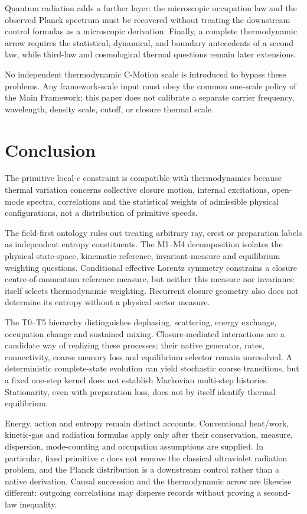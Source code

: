 \documentclass[11pt]{article}
\theoremstyle{definition}
\newcommand{\cmotion}{\mbox{C-Motion}}
\begin{document}
Quantum radiation adds a further layer: the microscopic occupation law and the observed
Planck spectrum must be recovered without treating the downstream control formulas as a
microscopic derivation.  Finally, a complete thermodynamic arrow requires the statistical,
dynamical, and boundary antecedents of a second law, while third-law and cosmological
thermal questions remain later extensions.

No independent thermodynamic \cmotion{} scale is introduced to bypass these problems.
Any framework-scale input must obey the common one-scale policy of the Main Framework;
this paper does not calibrate a separate carrier frequency, wavelength, density scale,
cutoff, or closure thermal scale.

\section{Conclusion}
\label{sec:conclusion}
The primitive local-$c$ constraint is compatible with thermodynamics because
thermal variation concerns collective closure motion, internal excitations,
open-mode spectra, correlations and the statistical weights of admissible
physical configurations, not a distribution of primitive speeds.

The field-first ontology rules out treating arbitrary ray, crest or preparation
labels as independent entropy constituents.  The M1--M4 decomposition isolates
the physical state-space, kinematic reference, invariant-measure and equilibrium
weighting questions.  Conditional effective Lorentz symmetry constrains a
closure centre-of-momentum reference measure, but neither this measure nor
invariance itself selects thermodynamic weighting.  Recurrent closure geometry
also does not determine its entropy without a physical sector measure.

The T0--T5 hierarchy distinguishes dephasing, scattering, energy exchange,
occupation change and sustained mixing.  Closure-mediated interactions are a
candidate way of realizing these processes; their native generator, rates,
connectivity, coarse memory loss and equilibrium selector remain unresolved.
A deterministic complete-state evolution can yield stochastic coarse transitions,
but a fixed one-step kernel does not establish Markovian multi-step histories.
Stationarity, even with preparation loss, does not by itself identify thermal
equilibrium.

Energy, action and entropy remain distinct accounts.  Conventional heat/work,
kinetic-gas and radiation formulas apply only after their conservation,
measure, dispersion, mode-counting and occupation assumptions are supplied.
In particular, fixed primitive $c$ does not remove the classical ultraviolet
radiation problem, and the Planck distribution is a downstream control rather
than a native derivation.  Causal succession and the thermodynamic arrow are
likewise different: outgoing correlations may disperse records without proving
a second-law inequality.
\end{document}
